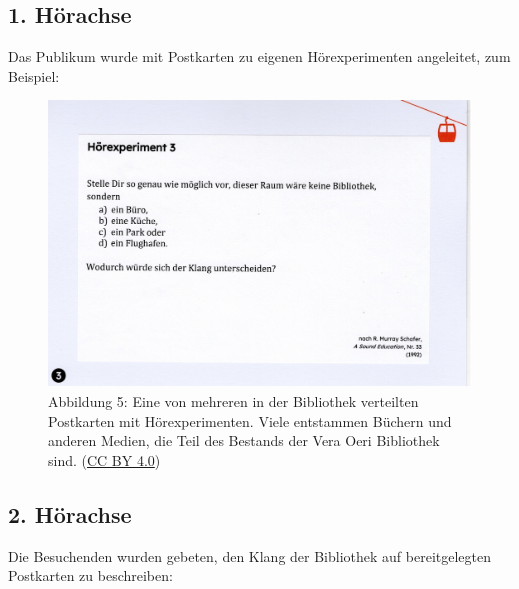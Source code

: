 \documentclass[a4paper,
fontsize=11pt,
oneside,
numbers=noperiodatend,
parskip=half-,
bibliography=totoc,
final
]{scrartcl}
\begin{document}
\hypertarget{huxf6rachse}{%
\subsection{1. Hörachse}\label{huxf6rachse}}

Das Publikum wurde mit Postkarten zu eigenen Hörexperimenten angeleitet,
zum Beispiel:

\begin{figure}[h]
\centering
\includegraphics{img/Abb5.jpg}
\caption{Abbildung 5: Eine von mehreren in der Bibliothek verteilten
Postkarten mit Hörexperimenten. Viele entstammen Büchern und anderen
Medien, die Teil des Bestands der Vera Oeri Bibliothek sind. (\href{https://creativecommons.org/licenses/by/4.0/}{CC BY 4.0})}
\end{figure}

\hypertarget{huxf6rachse-1}{%
\subsection{2. Hörachse}\label{huxf6rachse-1}}

Die Besuchenden wurden gebeten, den Klang der Bibliothek auf
bereitgelegten Postkarten zu beschreiben:
\end{document}
